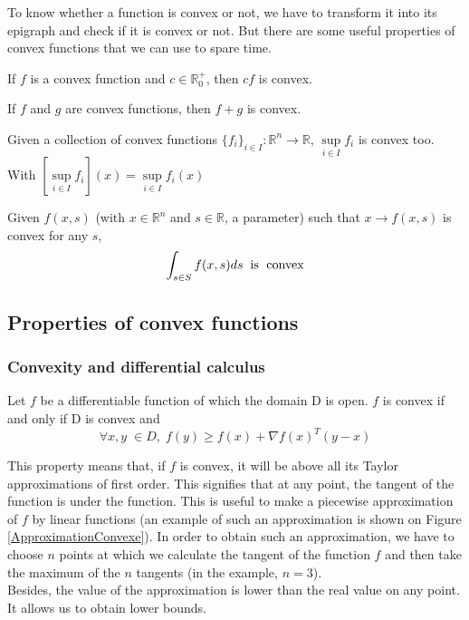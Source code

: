 To know whether a function is convex or not, we have to transform it into its epigraph and check if it is convex or not. But there are some useful properties of convex functions that we can use to spare time. 
\vspace{0.5cm}
\begin{property}
If $f$ is a convex function and $c \in \mathbb{R}_0^+$, then $cf$ is convex.  
\end{property}
\vspace{0.5cm}
\begin{property}
If $f$ and $g$ are convex functions, then $f+g$ is convex. 
\end{property}
\vspace{0.5cm}
\begin{property}
Given a collection of convex functions $\{f_i\}_{i \in I}: \mathbb{R}^n \rightarrow \mathbb{R}$, $\sup \limits _{i \in I}f_i$ is convex too.\\
With $\left[ \sup \limits _{i \in I} f_i\right] (x)= \sup \limits _{i \in I} f_i(x)$
\end{property}
\vspace{0.5cm}
\begin{property}
Given $f(x,s)$ (with $x \in \mathbb{R}^n$ and $s \in \mathbb{R}$, a parameter) such that $x \rightarrow f(x,s)$ is convex for any $s$, 
$$\int_{s \in S}f(x,s)ds\;\; \text{is \;convex}$$
\end{property}

\subsection{Properties of convex functions}
\subsubsection{Convexity and differential calculus}

\begin{property}
Let $f$ be a differentiable function of which the domain D is open. 
$f$ is convex if and only if D is convex and
$$\forall x,y \; \in D, \;f(y)\geq f(x)+\nabla f(x)^T(y-x) $$
\end{property}
This property means that, if $f$ is convex, it will be above all its Taylor approximations of first order. This signifies that at any point, the tangent of the function is under the function. This is useful to make a piecewise approximation of $f$ by linear functions (an example of such an approximation is shown on Figure \ref{ApproximationConvexe}). In order to obtain such an approximation, we have to choose $n$ points at which we calculate the tangent of the function $f$ and then take the maximum of the $n$ tangents (in the example, $n=3$). \\
Besides, the value of the approximation is lower than the real value on any point. It allows us to obtain lower bounds.\\

